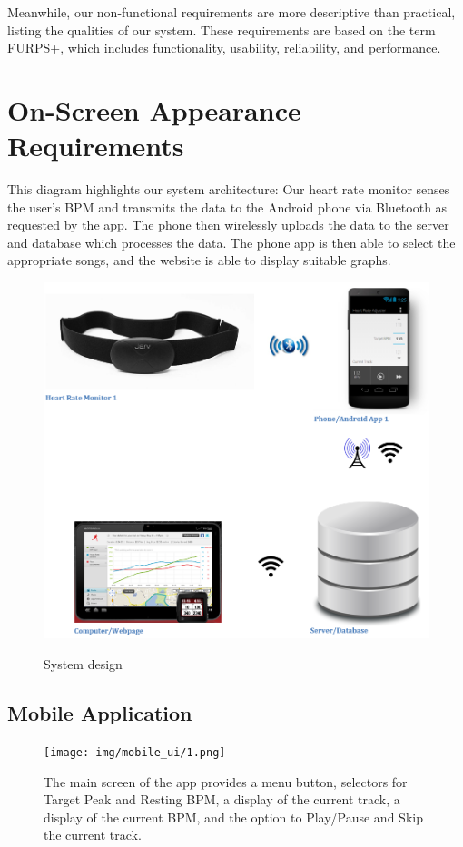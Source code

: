 \documentclass[letterpaper,english, 12pt]{scrreprt}
\begin{document}
Meanwhile, our non-functional requirements are more descriptive than practical,
listing the qualities of our system. These requirements are based on the term
FURPS+, which includes functionality, usability, reliability, and performance.

\section{On-Screen Appearance Requirements}
This diagram highlights our system architecture: Our heart rate monitor senses the
user's BPM and transmits the data to the Android phone via Bluetooth as requested
by the app. The phone then wirelessly uploads the data to the server and database
which processes the data. The phone app is then able to select the appropriate
songs, and the website is able to display suitable graphs.

\begin{figure}[H]
	\centering
	\includegraphics{img/system.png}\\
	\caption{System design}
\end{figure}

\subsection{Mobile Application}

\begin{figure}[H]
	\centering
	\texttt{[image: img/mobile\_ui/1.png]}\\
	\caption{The main screen of the app provides a menu button, selectors for Target Peak and Resting BPM, a display of the current track, a display of the current BPM, and the option to Play/Pause and Skip the current track.}
\end{figure}
\end{document}
